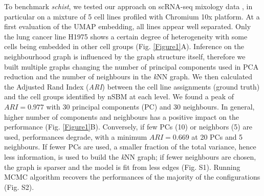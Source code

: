 \documentclass[10pt]{article}
\begin{document}
To benchmark \emph{schist}, we tested our approach on scRNA-seq mixology data \cite{tian_2019}, in particular on a mixture of 5 cell lines profiled with Chromium 10x platform. At a first evaluation of the UMAP embedding, all lines appear well separated. Only the lung cancer line H1975 shows a certain degree of heterogeneity with some cells being embedded in other cell groups (Fig. \ref{Figure1}A). Inference on the neighbourhood graph is influenced by the graph structure itself, therefore we built multiple graphs changing the number of principal components used in PCA reduction and the number of neighbours in the \emph{k}NN graph. We then calculated the Adjusted Rand Index (\emph{ARI}) between the cell line assignments (ground truth) and the cell groups identified by nSBM at each level. We found a peak of $ARI=0.977$ with 30 principal components (PC) and 30 neighbours. In general, higher number of components and neighbours has a positive impact on the performance (Fig. \ref{Figure1}B). Conversely, if few PCs (10) or neighbors (5) are used, performances degrade, with a minimum $ARI=0.669$ at 20 PCs and 5 neighbours. If fewer PCs are used, a smaller fraction of the total variance, hence less information, is used to build the \emph{k}NN graph; if fewer neighbours are chosen, the graph is sparser and the model is fit from less edges (Fig. S1). Running MCMC algorithm recovers the performances of the majority of the configurations (Fig. S2).
\end{document}
